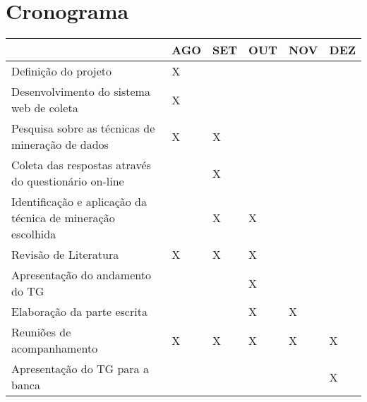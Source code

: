 \documentclass[projtg]{mdtufsm}
\begin{document}
\chapter{Cronograma}
\begin{tabu} to 0.9\linewidth{|X[6]|X|X|X|X|X|}
	\hline
	& AGO & SET & OUT & NOV & DEZ \\
	\hline
	Definição do projeto & X & & & & \\
	\hline
	Desenvolvimento do sistema web de coleta & X & & & & \\
	\hline
	Pesquisa sobre as técnicas de mineração de dados & X & X & & & \\
	\hline
	Coleta das respostas através do questionário on-line & & X & & & \\
	\hline
	Identificação e aplicação da técnica de mineração escolhida & & X & X & & \\
	\hline
	Revisão de Literatura & X & X & X & & \\
	\hline
	Apresentação do andamento do TG & & & X & & \\
	\hline
	Elaboração da parte escrita & & & X & X & \\
	\hline
	Reuniões de acompanhamento & X & X & X & X & X \\
	\hline
	Apresentação do TG para a banca & & & & & X \\
	\hline
\end{tabu}
 
\setlength{\baselineskip}{\baselineskip}



\end{document}
